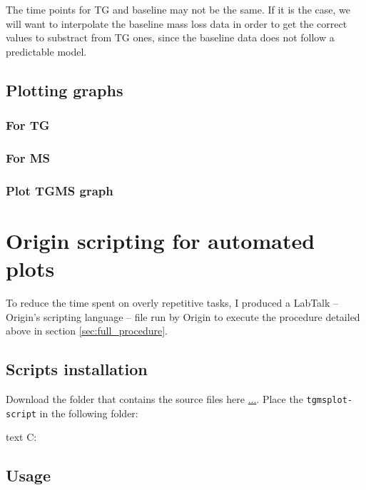\documentclass[a4paper, 11pt, raggedright, parskip]{tufte-style-article}
\begin{document}
The time points for TG and baseline may not be the same. If it is the case, we will want to interpolate the baseline mass loss data in order to get the correct values to substract from TG ones, since the baseline data does not follow a predictable model.


\subsection{Plotting graphs}


\subsubsection{For TG}


\subsubsection{For MS}


\subsubsection{Plot TGMS graph}


\section{Origin scripting for automated plots}
\label{sec:origin_scripting}	
	
To reduce the time spent on overly repetitive tasks, I produced a LabTalk -- Origin's scripting language -- file run by Origin to execute the procedure detailed above in section \ref{sec:full_procedure}.


\subsection{Scripts installation}

Download the folder that contains the source files here \url{...}.
Place the \texttt{tgmsplot-script} in the following folder:

%
\begin{codebox}{text}
C:\ProgramFiles{}\
\end{codebox}


\subsection{Usage}
\end{document}
